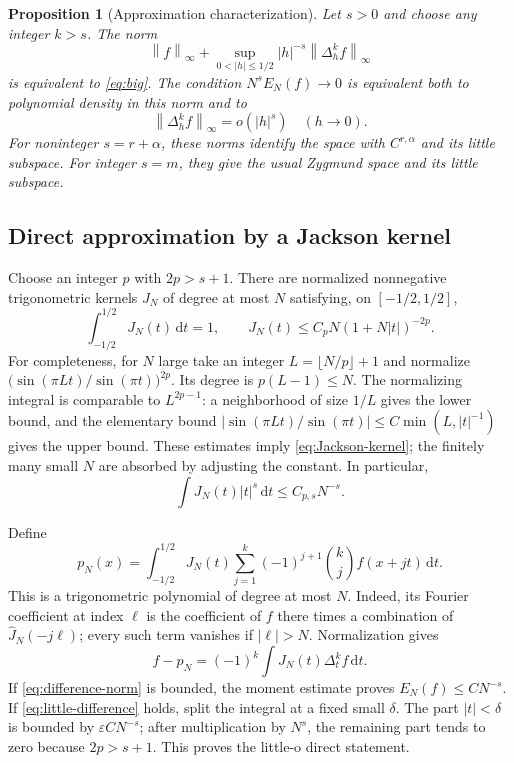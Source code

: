 \documentclass[11pt,a4paper]{article}
\numberwithin{equation}{section}
\newtheorem{proposition}[theorem]{Proposition}
\theoremstyle{definition}
\theoremstyle{remark}
\newcommand{\norm}[1]{\left\lVert#1\right\rVert}
\newcommand{\dd}{\,\mathrm d}
\begin{document}
\begin{proposition}[Approximation characterization]
\label{prop:approx-characterization}
Let $s>0$ and choose any integer $k>s$. The norm
\begin{equation}
 \norm f_\infty+
 \sup_{0<|h|\le1/2}|h|^{-s}\norm{\Delta_h^k f}_\infty
 \label{eq:difference-norm}
\end{equation}
is equivalent to \eqref{eq:big}. The condition
$N^sE_N(f)\to0$ is equivalent both to polynomial density in this norm
and to
\begin{equation}
 \norm{\Delta_h^k f}_\infty=o(|h|^s)\quad(h\to0).
 \label{eq:little-difference}
\end{equation}
For noninteger $s=r+\alpha$, these norms identify the space with
$C^{r,\alpha}$ and its little subspace. For integer $s=m$, they
give the usual Zygmund space and its little subspace.
\end{proposition}

\subsection{Direct approximation by a Jackson kernel}
Choose an integer $p$ with $2p>s+1$. There are normalized nonnegative
trigonometric kernels $J_N$ of degree at most $N$ satisfying, on
$[-1/2,1/2]$,
\begin{equation}
 \int_{-1/2}^{1/2}J_N(t)\dd t=1,
 \qquad J_N(t)\le C_pN(1+N|t|)^{-2p}.
 \label{eq:Jackson-kernel}
\end{equation}
For completeness, for $N$ large take an integer
$L=\lfloor N/p\rfloor+1$ and normalize
$\bigl(\sin(\pi Lt)/\sin(\pi t)\bigr)^{2p}$.
Its degree is $p(L-1)\le N$. The normalizing integral is comparable
to $L^{2p-1}$: a neighborhood of size $1/L$ gives the lower bound,
and the elementary bound
$|\sin(\pi Lt)/\sin(\pi t)|\le C\min(L,|t|^{-1})$
gives the upper bound. These estimates imply
\eqref{eq:Jackson-kernel}; the finitely many small $N$ are absorbed
by adjusting the constant. In particular,
\begin{equation}
 \int J_N(t)|t|^s\dd t\le C_{p,s}N^{-s}.
 \label{eq:Jackson-moment}
\end{equation}

Define
\begin{equation}
 p_N(x)=\int_{-1/2}^{1/2}J_N(t)
 \sum_{j=1}^k(-1)^{j+1}\binom kj f(x+jt)\dd t.
 \label{eq:Jackson-approximant}
\end{equation}
This is a trigonometric polynomial of degree at most $N$. Indeed, its
Fourier coefficient at index $\ell$ is the coefficient of $f$ there
times a combination of $\widehat J_N(-j\ell)$; every such term
vanishes if $|\ell|>N$. Normalization gives
\begin{equation}
 f-p_N=(-1)^k\int J_N(t)\Delta_t^k f\dd t.
 \label{eq:Jackson-error}
\end{equation}
If \eqref{eq:difference-norm} is bounded, the moment estimate proves
$E_N(f)\le C N^{-s}$. If
\eqref{eq:little-difference} holds, split the integral at a fixed
small $\delta$. The part $|t|<\delta$ is bounded by
$\varepsilon C N^{-s}$; after multiplication by $N^s$, the remaining
part tends to zero because $2p>s+1$. This proves the little-o direct
statement.
\end{document}
